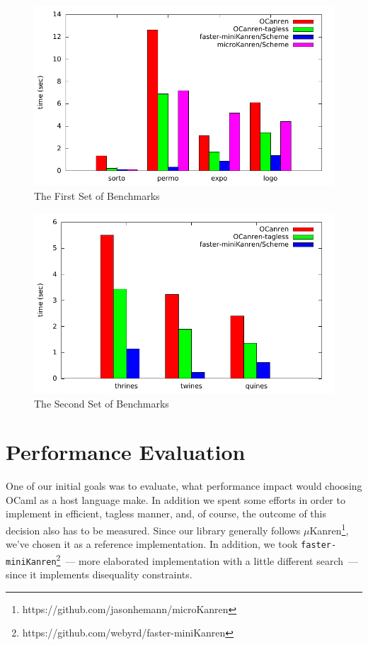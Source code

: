 \begin{figure}[t]
\centering
\includegraphics{graph1.pdf}
\caption{The First Set of Benchmarks}
\label{eval:first}
\end{figure}
\begin{figure}[t]
\centering
\includegraphics{graph2.pdf}
\caption{The Second Set of Benchmarks}
\label{eval:second}
\end{figure}

\section{Performance Evaluation}
\label{sec:evaluation}

One of our initial goals was to evaluate, what performance impact would choosing
OCaml as a host language make. In addition we spent some efforts in order to implement \miniKanren in
efficient, tagless manner, and, of course, the outcome of this decision also has to be measured.
Since our library generally follows $\mu$Kanren\footnote{https://github.com/jasonhemann/microKanren}, we've chosen it as a reference implementation.
In addition, we took \texttt{faster-miniKanren}\footnote{https://github.com/webyrd/faster-miniKanren}~--- more elaborated
implementation with a little different search~--- since it implements disequality constraints.

